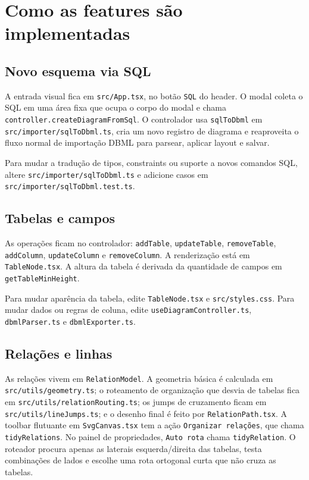 \documentclass[11pt,a4paper]{article}
\begin{document}
\section{Como as features são implementadas}

\subsection{Novo esquema via SQL}

A entrada visual fica em \texttt{src/App.tsx}, no botão \texttt{SQL} do header. O modal coleta o SQL em uma área fixa que ocupa o corpo do modal e chama \texttt{controller.createDiagramFromSql}. O controlador usa \texttt{sqlToDbml} em \texttt{src/importer/sqlToDbml.ts}, cria um novo registro de diagrama e reaproveita o fluxo normal de importação DBML para parsear, aplicar layout e salvar.

Para mudar a tradução de tipos, constraints ou suporte a novos comandos SQL, altere \texttt{src/importer/sqlToDbml.ts} e adicione casos em \texttt{src/importer/sqlToDbml.test.ts}.

\subsection{Tabelas e campos}

As operações ficam no controlador: \texttt{addTable}, \texttt{updateTable}, \texttt{removeTable}, \texttt{addColumn}, \texttt{updateColumn} e \texttt{removeColumn}. A renderização está em \texttt{TableNode.tsx}. A altura da tabela é derivada da quantidade de campos em \texttt{getTableMinHeight}.

Para mudar aparência da tabela, edite \texttt{TableNode.tsx} e \texttt{src/styles.css}. Para mudar dados ou regras de coluna, edite \texttt{useDiagramController.ts}, \texttt{dbmlParser.ts} e \texttt{dbmlExporter.ts}.

\subsection{Relações e linhas}

As relações vivem em \texttt{RelationModel}. A geometria básica é calculada em \texttt{src/utils/geometry.ts}; o roteamento de organização que desvia de tabelas fica em \texttt{src/utils/relationRouting.ts}; os jumps de cruzamento ficam em \texttt{src/utils/lineJumps.ts}; e o desenho final é feito por \texttt{RelationPath.tsx}. A toolbar flutuante em \texttt{SvgCanvas.tsx} tem a ação \texttt{Organizar relações}, que chama \texttt{tidyRelations}. No painel de propriedades, \texttt{Auto rota} chama \texttt{tidyRelation}. O roteador procura apenas as laterais esquerda/direita das tabelas, testa combinações de lados e escolhe uma rota ortogonal curta que não cruza as tabelas.
\end{document}
